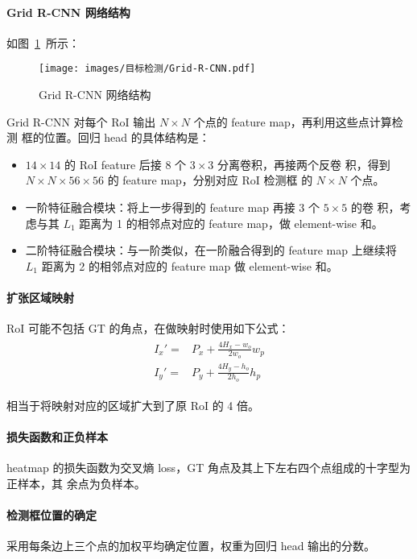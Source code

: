 \paragraph{Grid R-CNN 网络结构}
如图~\ref{fig:Grid-RCNN}~所示：

\begin{figure}[ht]
  \centering
  \texttt{[image: images/目标检测/Grid-R-CNN.pdf]}
  \caption{Grid R-CNN 网络结构}
  \label{fig:Grid-RCNN}
\end{figure}

Grid R-CNN 对每个 RoI 输出 $N \times N$ 个点的 feature map，再利用这些点计算检测
框的位置。回归 head 的具体结构是：

\begin{itemize}
  \item $14 \times 14$ 的 RoI feature 后接 8 个 $3 \times 3$ 分离卷积，再接两个反卷
    积，得到 $N \times N \times 56 \times 56$ 的 feature map，分别对应 RoI 检测框
    的 $N \times N$ 个点。
  \item 一阶特征融合模块：将上一步得到的 feature map 再接 3 个 $5 \times 5$ 的卷
    积，考虑与其 $L_1$ 距离为 1 的相邻点对应的 feature map，做 element-wise 和。
  \item 二阶特征融合模块：与一阶类似，在一阶融合得到的 feature map 上继续将
    $L_1$ 距离为 2 的相邻点对应的 feature map 做 element-wise 和。
\end{itemize}

\paragraph{扩张区域映射}
RoI 可能不包括 GT 的角点，在做映射时使用如下公式：
\begin{align}
  \label{equ:yolo-v1-loss}
  \begin{split}
    I_x' = & P_x + \frac{4H_{x} - w_o}{2w_o} w_p  \\
    I_y' = & P_y + \frac{4H_{y} - h_o}{2h_o} h_p
  \end{split}
\end{align}

相当于将映射对应的区域扩大到了原 RoI 的 4 倍。

\paragraph{损失函数和正负样本}
heatmap 的损失函数为交叉熵 loss，GT 角点及其上下左右四个点组成的十字型为正样本，其
余点为负样本。

\paragraph{检测框位置的确定}
采用每条边上三个点的加权平均确定位置，权重为回归 head 输出的分数。

